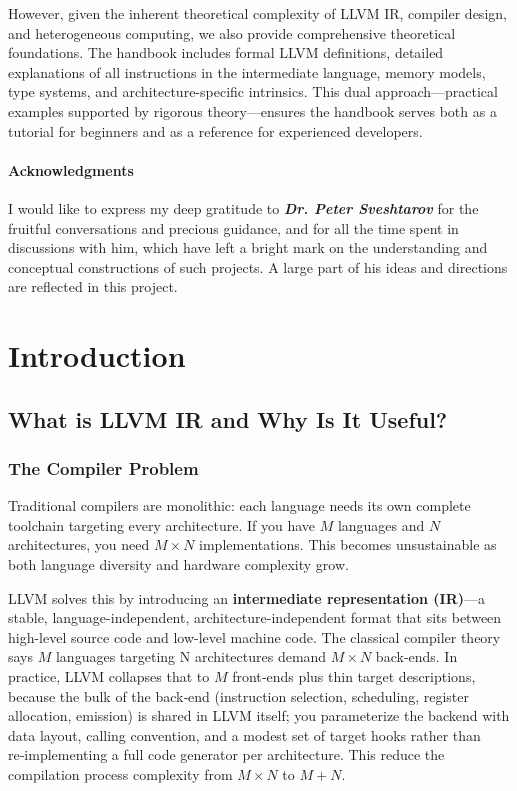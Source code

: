\documentclass[11pt,oneside]{book}
\begin{document}
However, given the inherent theoretical complexity of LLVM IR, compiler design, and heterogeneous computing, we also provide comprehensive theoretical foundations. The handbook includes formal LLVM definitions, detailed explanations of all instructions in the intermediate language, memory models, type systems, and architecture-specific intrinsics. This dual approach—practical examples supported by rigorous theory—ensures the handbook serves both as a tutorial for beginners and as a reference for experienced developers.

\subsection*{Acknowledgments}

I would like to express my deep gratitude to \textbf{\textit{Dr. Peter Sveshtarov}} for the fruitful conversations and precious guidance, and for all the time spent in discussions with him, which have left a bright mark on the understanding and conceptual constructions of such projects. A large part of his ideas and directions are reflected in this project.

\tableofcontents

\mainmatter

\part{Introduction}

\chapter{What is LLVM IR and Why Is It Useful?}

\section{The Compiler Problem}
Traditional compilers are monolithic: each language needs its own complete toolchain targeting every architecture. If you have \(M\) languages and \(N\) architectures, you need \(M \times N\) implementations. This becomes unsustainable as both language diversity and hardware complexity grow.

LLVM solves this by introducing an \textbf{intermediate representation (IR)}—a stable, language-independent, architecture-independent format that sits between high-level source code and low-level machine code. 
The classical compiler theory says \(M\) languages targeting N architectures demand \(M \times N\) back‑ends. In practice, LLVM collapses that to \(M\) front‑ends plus thin target descriptions, because the
  bulk of the back‑end (instruction selection, scheduling, register allocation, emission) is
  shared in LLVM itself; you parameterize the backend with data layout, calling convention,
  and a modest set of target hooks rather than re‑implementing a full code generator per
  architecture. This reduce the compilation process complexity from \(M \times N\) to  \(M + N\).
\end{document}
